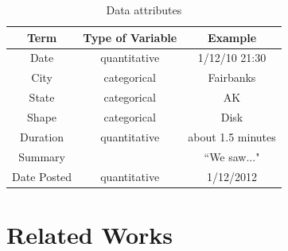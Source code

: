 \documentclass[journal]{vgtc}                %
\begin{document}
\begin{table}[h]
\caption{Data attributes} %
\centering %
\begin{tabular}{c c c} %
\hline\hline %
 Term & Type of Variable & Example\\ [0.5ex]
\hline %

Date & quantitative & 1/12/10 21:30\\[1ex] %

City & categorical & Fairbanks\\[1ex] %

State & categorical & AK\\[1ex] %

Shape & categorical	& Disk\\[1ex] %

Duration & quantitative & about 1.5 minutes\\[1ex] %

Summary & & ``We saw..."\\[1ex] %

Date Posted & quantitative & 1/12/2012\\[1ex] %

\hline 
\end{tabular}
\label{tab:PPer}
\end{table}

\section{Related Works}
\end{document}
